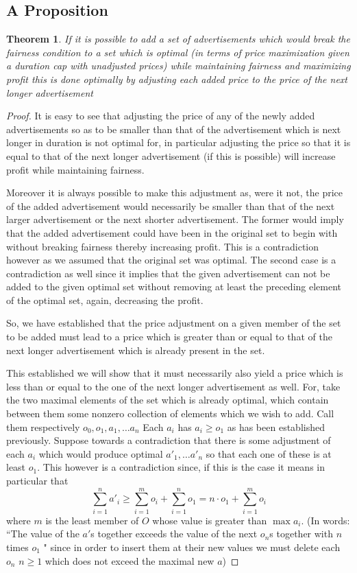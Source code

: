 \documentclass{article}
\newtheorem{theorem}{Theorem}[section]
\begin{document}
\subsection{A Proposition}
\begin{theorem}\label{tog}If it is possible to add a set of advertisements which would break the fairness condition to a set which is optimal (in terms of price maximization given a duration cap with unadjusted prices) while maintaining fairness and maximizing profit this is done optimally by adjusting each added price to the price of the next longer advertisement \end{theorem}
\begin{proof}
It is easy to see that adjusting the price of any of the newly added advertisements so as to be smaller than that of the advertisement which is next longer in duration is not optimal for, in particular adjusting the price so that it is equal to that of the next longer advertisement (if this is possible) will increase profit while maintaining fairness. 

Moreover it is always possible to make this adjustment as, were it not, the price of the added advertisement would necessarily be smaller than that of the next larger advertisement or the next shorter advertisement. The former would imply that the added advertisement could have been in the original set to begin with without breaking fairness thereby increasing profit. This is a contradiction however as we  assumed that the original set was optimal. The second case is a contradiction as well since it implies that the given advertisement can not be added to the given optimal set without removing at least the preceding element of the optimal set, again, decreasing the profit.

So, we have established that the price adjustment on a given member of the set to be added must lead to a price which is greater than or equal to that of the next longer advertisement which is already present in the set.

This established we will show that it must necessarily also yield a price which is less than or equal to the one of the next longer advertisement as well. For, take the two maximal elements of the set which is already optimal, which contain between them some nonzero collection of elements which we wish to add. Call them respectively $o_0, o_1, a_1, \dots a_n$ Each $a_i$ has $a_i\geq o_1$ as has been established previously. Suppose towards a contradiction that there is some adjustment of each $a_i$ which would produce optimal $a'_1, \dots a'_n$ so that each one of these is at least $o_1$. This however is a contradiction since, if this is the case it means in particular that 
\[\sum_{i=1}^n a'_i \geq \sum_{i=1}^m o_i + \sum_{i=1}^n o_1 = n \cdot o_1 +  \sum_{i=1}^m o_i  \]
where $m$ is the least member of $O$ whose value is greater than $\max{a_i}$. (In words: ``The value of the $a'$s together exceeds the value of the next $o_n$s together with $n$ times $o_1$ " since in order to insert them at their new values we must delete each $o_n$ $n\geq1$ which does not exceed the maximal new $a$) 


\end{proof}
\end{document}
